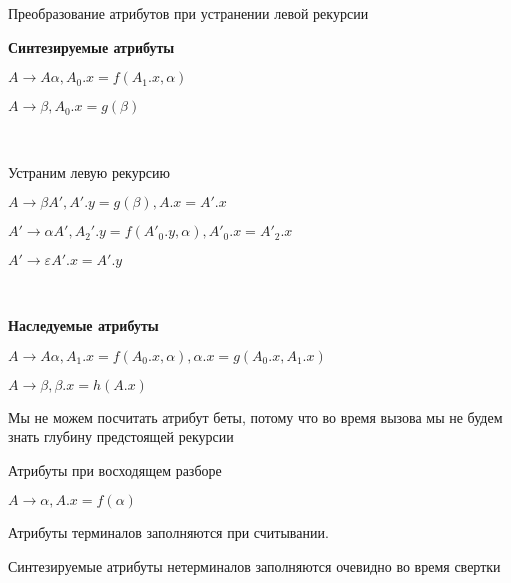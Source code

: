 \begin{para}{Преобразование атрибутов при устранении левой рекурсии}

\textbf{Синтезируемые атрибуты}

$A \rightarrow A\alpha, A_0.x = f(A_1.x, \alpha)$

$A \rightarrow \beta, A_0.x = g(\beta)$

~\

Устраним левую рекурсию

$A \rightarrow \beta A', A'.y = g(\beta), A.x = A'.x$

$A' \rightarrow \alpha A', A_2'.y = f(A'_0.y, \alpha), A'_0.x = A'_2.x$

$A' \rightarrow \varepsilon A'.x = A'.y$

~\

\textbf{Наследуемые атрибуты}

$A \rightarrow A\alpha, A_1.x = f(A_0.x, \alpha), \alpha.x = g(A_0.x, A_1.x)$

$A \rightarrow \beta, \beta.x = h(A.x)$

Мы не можем посчитать атрибут беты, потому что во время вызова мы не будем знать глубину предстоящей рекурсии

\end{para}


\begin{para}{Атрибуты при восходящем разборе}

$A \rightarrow \alpha, A.x = f(\alpha)$

Атрибуты терминалов заполняются при считывании.

Синтезируемые атрибуты нетерминалов заполняются очевидно во время свертки



\end{para}